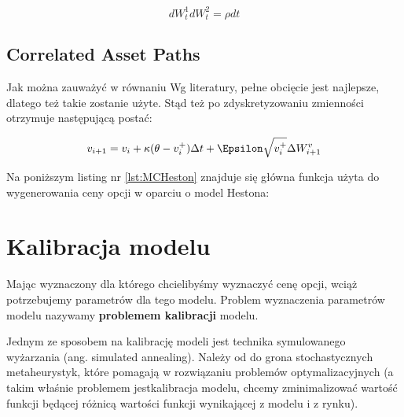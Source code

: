 \documentclass{pracamgr}
\begin{document}
\begin{equation}
dW_t^1 dW_t^2  = \rho dt
\end{equation}



\section{Correlated Asset Paths} %
\label{sec:CorrelatedAssetPaths}

Jak można zauważyć w równaniu  
Wg literatury, pełne obcięcie jest najlepsze, dlatego też takie zostanie użyte.
Stąd też po zdyskretyzowaniu zmienności otrzymuje następującą postać:

\begin{equation}
  v_{i+1} = v_i + \kappa (\theta - v_i^{+})\Delta t + \Epsilon \sqrt{v_i^{+}} \Delta W_{i+1}^v
\end{equation}




Na poniższym listing nr \ref{lst:MCHeston} znajduje się główna funkcja użyta do wygenerowania ceny 
opcji w oparciu o model Hestona:





\chapter{Kalibracja modelu}
\label{chap:chapterModelCalibration}


Mając wyznaczony dla którego chcielibyśmy wyznaczyć cenę opcji, wciąż potrzebujemy parametrów dla tego modelu. 
Problem wyznaczenia parametrów modelu nazywamy \textbf{problemem kalibracji} modelu.  

Jednym ze sposobem na kalibrację modeli jest technika symulowanego wyżarzania (ang. simulated annealing). Należy od do grona stochastycznych metaheurystyk, które pomagają w rozwiązaniu problemów optymalizacyjnych (a takim właśnie problemem jestkalibracja modelu, chcemy zminimalizować wartość funkcji będącej różnicą wartości funkcji wynikającej z modelu i z rynku).
\end{document}
